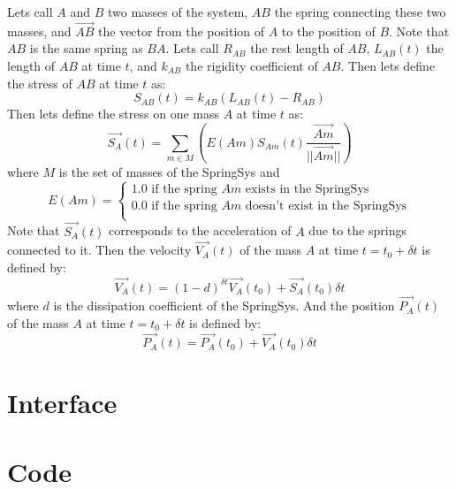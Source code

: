 \documentclass[12pt, a4paper]{article}
\begin{document}
Lets call $A$ and $B$ two masses of the system, $AB$ the spring connecting these two masses, and $\overrightarrow{AB}$ the vector from the position of $A$ to the position of $B$. Note that $AB$ is the same spring as $BA$. Lets call $R_{AB}$ the rest length of $AB$, $L_{AB}(t)$ the length of $AB$ at time $t$, and $k_{AB}$ the rigidity coefficient of $AB$. Then lets define the stress of $AB$ at time $t$ as:\\
$$
S_{AB}(t) = k_{AB}(L_{AB}(t)-R_{AB})
$$
Then lets define the stress on one mass $A$ at time $t$ as:\\
$$
\overrightarrow{S_A}(t) = \sum_{m\in M}\left(E(Am)S_{Am}(t)\frac{\overrightarrow{Am}}{||\overrightarrow{Am}||}\right)
$$
where $M$ is the set of masses of the SpringSys and 
$$
E(Am)=\left\lbrace
\begin{array}{l}
1.0\textrm{ if the spring }Am\textrm{ exists in the SpringSys}\\
0.0\textrm{ if the spring }Am\textrm{ doesn't exist in the SpringSys}\\
\end{array}
\right.
$$
Note that $\overrightarrow{S_A}(t)$ corresponds to the acceleration of $A$ due to the springs connected to it. Then the velocity $\overrightarrow{V_A}(t)$ of the mass $A$ at time $t=t_0+\delta t$ is defined by:\\
$$
\overrightarrow{V_A}(t)=(1-d)^{\delta t}\overrightarrow{V_A}(t_0)+\overrightarrow{S_A}(t_0)\delta t
$$
where $d$ is the dissipation coefficient of the SpringSys.
And the position $\overrightarrow{P_A}(t)$ of the mass $A$ at time $t=t_0+\delta t$ is defined by:\\
$$
\overrightarrow{P_A}(t)=\overrightarrow{P_A}(t_0)+\overrightarrow{V_A}(t_0)\delta t
$$

\section{Interface}

\begin{scriptsize}
\begin{ttfamily}

\end{ttfamily}
\end{scriptsize}

\section{Code}

\begin{scriptsize}
\begin{ttfamily}

\end{ttfamily}
\end{scriptsize}
\end{document}
